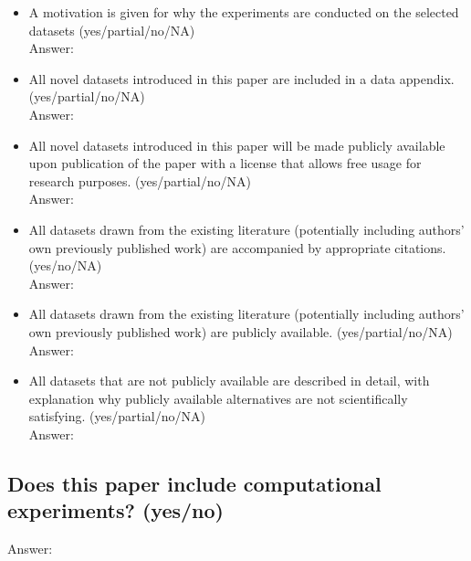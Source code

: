 \begin{itemize}
    \item A motivation is given for why the experiments are conducted on the selected datasets (yes/partial/no/NA)\\
    Answer: \answerYes{}
    \item All novel datasets introduced in this paper are included in a data appendix. (yes/partial/no/NA)\\
    Answer: \answerNA{}
    \item All novel datasets introduced in this paper will be made publicly available upon publication of the paper with a license that allows free usage for research purposes. (yes/partial/no/NA)\\
        Answer: \answerNA{}
    \item All datasets drawn from the existing literature (potentially including authors' own previously published work) are accompanied by appropriate citations. (yes/no/NA)\\
    Answer: \answerYes{}
    \item All datasets drawn from the existing literature (potentially including authors' own previously published work) are publicly available. (yes/partial/no/NA)\\
    Answer: \answerYes{}
    \item All datasets that are not publicly available are described in detail, with explanation why publicly available alternatives are not scientifically satisfying. (yes/partial/no/NA)\\
    Answer: \answerNA{}
\end{itemize}

\subsection*{Does this paper include computational experiments? (yes/no)}
Answer: \answerYes{}

